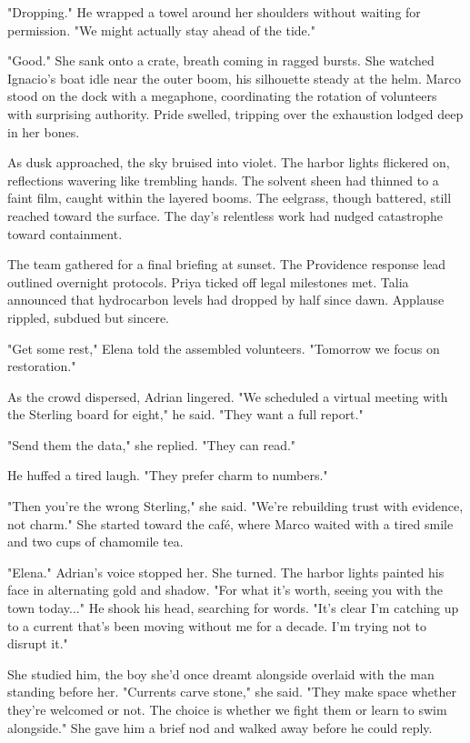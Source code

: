 "Dropping." He wrapped a towel around her shoulders without waiting for permission. "We might actually stay ahead of the tide."

"Good." She sank onto a crate, breath coming in ragged bursts. She watched Ignacio's boat idle near the outer boom, his silhouette steady at the helm. Marco stood on the dock with a megaphone, coordinating the rotation of volunteers with surprising authority. Pride swelled, tripping over the exhaustion lodged deep in her bones.

As dusk approached, the sky bruised into violet. The harbor lights flickered on, reflections wavering like trembling hands. The solvent sheen had thinned to a faint film, caught within the layered booms. The eelgrass, though battered, still reached toward the surface. The day’s relentless work had nudged catastrophe toward containment.

The team gathered for a final briefing at sunset. The Providence response lead outlined overnight protocols. Priya ticked off legal milestones met. Talia announced that hydrocarbon levels had dropped by half since dawn. Applause rippled, subdued but sincere.

"Get some rest," Elena told the assembled volunteers. "Tomorrow we focus on restoration."

As the crowd dispersed, Adrian lingered. "We scheduled a virtual meeting with the Sterling board for eight," he said. "They want a full report."

"Send them the data," she replied. "They can read."

He huffed a tired laugh. "They prefer charm to numbers."

"Then you're the wrong Sterling," she said. "We're rebuilding trust with evidence, not charm." She started toward the café, where Marco waited with a tired smile and two cups of chamomile tea.

"Elena." Adrian's voice stopped her. She turned. The harbor lights painted his face in alternating gold and shadow. "For what it's worth, seeing you with the town today..." He shook his head, searching for words. "It's clear I'm catching up to a current that's been moving without me for a decade. I'm trying not to disrupt it."

She studied him, the boy she'd once dreamt alongside overlaid with the man standing before her. "Currents carve stone," she said. "They make space whether they're welcomed or not. The choice is whether we fight them or learn to swim alongside." She gave him a brief nod and walked away before he could reply.

